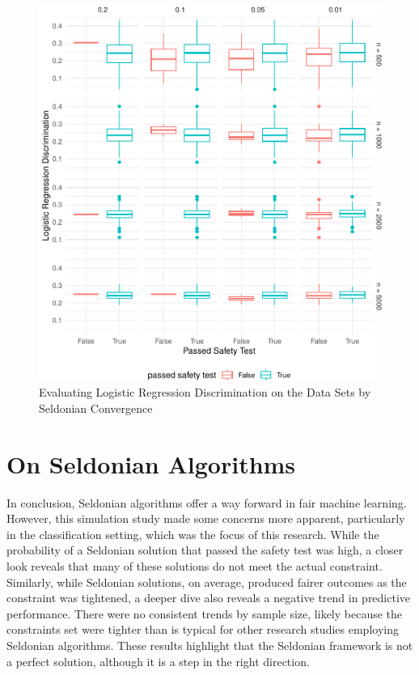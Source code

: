 \documentclass[12pt, twoside]{amherstthesis}
\begin{document}
\begin{figure}

{\centering \includegraphics{Dasha-Asienga_StatThesis_files/figure-latex/ch4fig6-1} 

}

\caption{Evaluating Logistic Regression Discrimination on the Data Sets by Seldonian Convergence}\label{fig:ch4fig6}
\end{figure}
\newpage

\hypertarget{on-seldonian-algorithms}{%
\section{On Seldonian Algorithms}\label{on-seldonian-algorithms}}

In conclusion, Seldonian algorithms offer a way forward in fair machine learning. However, this simulation study made some concerns more apparent, particularly in the classification setting, which was the focus of this research. While the probability of a Seldonian solution that passed the safety test was high, a closer look reveals that many of these solutions do not meet the actual constraint. Similarly, while Seldonian solutions, on average, produced fairer outcomes as the constraint was tightened, a deeper dive also reveals a negative trend in predictive performance. There were no consistent trends by sample size, likely because the constraints set were tighter than is typical for other research studies employing Seldonian algorithms. These results highlight that the Seldonian framework is not a perfect solution, although it is a step in the right direction.
\end{document}
